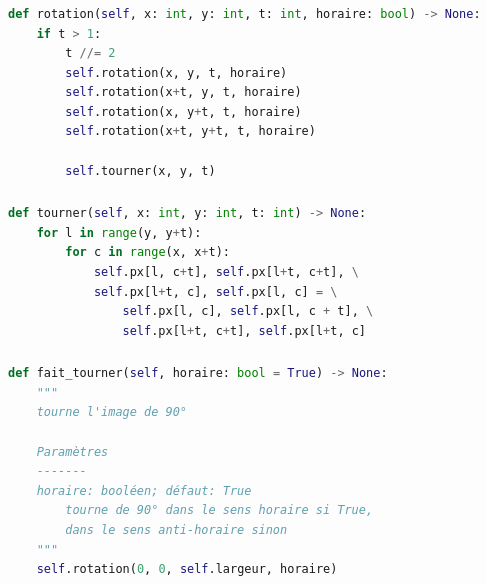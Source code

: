 \documentclass[svgnames,11pt]{beamer}
\begin{document}
\begin{frame}[fragile]
    \frametitle{}

    \begin{center}
        \begin{lstlisting}[language=Python , basicstyle=\ttfamily\small, xleftmargin=2em, xrightmargin=2em]
def rotation(self, x: int, y: int, t: int, horaire: bool) -> None:
    if t > 1:
        t //= 2
        self.rotation(x, y, t, horaire)
        self.rotation(x+t, y, t, horaire)
        self.rotation(x, y+t, t, horaire)
        self.rotation(x+t, y+t, t, horaire)

        self.tourner(x, y, t)
\end{lstlisting}
    \end{center}

\end{frame}
\begin{frame}[fragile]
    \frametitle{}

    \begin{center}
        \begin{lstlisting}[language=Python , basicstyle=\ttfamily\small, xleftmargin=.5em, xrightmargin=.5em]
def tourner(self, x: int, y: int, t: int) -> None:
    for l in range(y, y+t):
        for c in range(x, x+t):
            self.px[l, c+t], self.px[l+t, c+t], \
            self.px[l+t, c], self.px[l, c] = \
                self.px[l, c], self.px[l, c + t], \
                self.px[l+t, c+t], self.px[l+t, c]
\end{lstlisting}
    \end{center}

\end{frame}
\begin{frame}[fragile]
    \frametitle{}

    \begin{center}
        \begin{lstlisting}[language=Python , basicstyle=\ttfamily\small, xleftmargin=2em, xrightmargin=2em]
def fait_tourner(self, horaire: bool = True) -> None:
    """
    tourne l'image de 90°

    Paramètres
    -------
    horaire: booléen; défaut: True
        tourne de 90° dans le sens horaire si True,
        dans le sens anti-horaire sinon
    """
    self.rotation(0, 0, self.largeur, horaire)
\end{lstlisting}
        \label{CODE}
    \end{center}

\end{frame}
\end{document}

